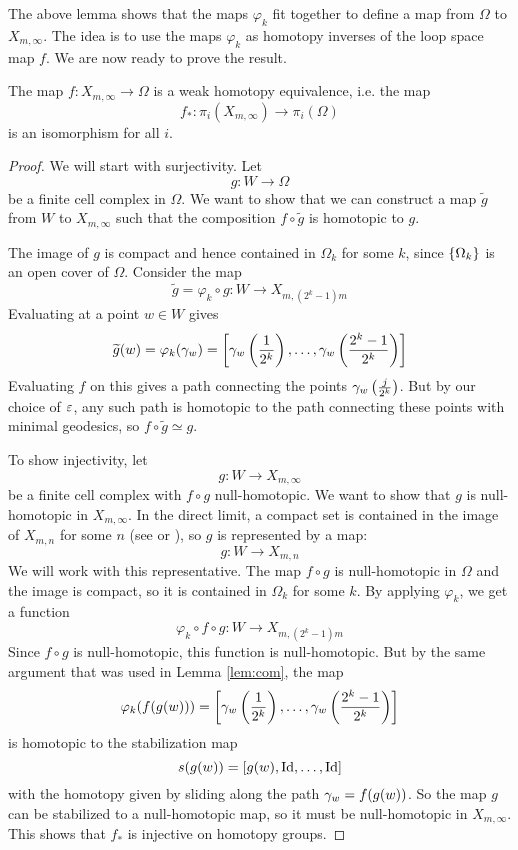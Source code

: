 The above lemma shows that the maps $\varphi_k$ fit together to define
a map from $\Omega$ to $X_{m,\infty}$.
The idea is to use the maps $\varphi_k$ as homotopy inverses of the
loop space map $f$. We are now ready to prove the result.

\begin{theorem}
  The map $f : X_{m,\infty} \to \Omega$ is a weak homotopy
  equivalence, i.e. the map
  \[f_* : \pi_i(X_{m,\infty}) \to \pi_i(\Omega)\]
  is an isomorphism for all $i$.
\end{theorem}

\begin{proof}
  We will start with surjectivity. Let
  \[ g : W \to \Omega \]
  be a finite cell complex in $\Omega$. We want to show that we can
  construct a map $\widetilde g$ from $W$ to $X_{m,\infty}$ such that
  the composition $f\circ \widetilde g$ is homotopic to $g$.
  
  The image of $g$ is compact and hence contained in $\Omega_k$ for
  some $k$, since $\left\{ \Omega_k \right\}$ is an open cover of
  $\Omega$. Consider the map 
  \[ \widetilde g = \varphi_k\circ g : W \to X_{m,(2^k-1)m} \]
  Evaluating at a point $w\in W$ gives
  \[ \widetilde g(w) = \varphi_k(\gamma_w) = \left[
    \gamma_w\left(\frac{1}{2^k}\right),\dots,
    \gamma_w\left(\frac{2^k-1}{2^k}\right) \right] \]
  Evaluating $f$ on this gives a path connecting the points
  $\gamma_w\left(\frac{j}{2^k}\right)$. But by our choice of $\varepsilon$, any
  such path is homotopic to the path connecting these points with
  minimal geodesics, so $f\circ\widetilde g \simeq g$.

  To show injectivity, let
  \[ g : W \to X_{m,\infty}\]
  be a finite cell complex with $f\circ g$ null-homotopic. We want to
  show that $g$ is null-homotopic in $X_{m,\infty}$. In the
  direct limit, a compact set is contained in the image of $X_{m,n}$
  for some $n$ (see \cite[Proposition~A.1]{hatcher} or
  \cite[Chapter~9.4]{may}), so $g$ is represented by a map:
  \[ g : W \to X_{m,n} \]
  We will work with this representative. The map $f\circ
  g$ is null-homotopic in $\Omega$ and the image is compact, so it is
  contained in $\Omega_k$ for some $k$. By applying $\varphi_k$, we
  get a function
  \[ \varphi_k\circ f\circ g : W \to X_{m,(2^k-1)m} \]
  Since $f\circ g$ is null-homotopic, this function is
  null-homotopic. But by the same argument that was used in
  Lemma \ref{lem:com}, the map
  \[ \varphi_k(f(g(w))) = \left[
    \gamma_w\left(\frac{1}{2^k}\right),\dots,\gamma_w\left(\frac{2^k-1}{2^k}
    \right)\right] \] 
  is homotopic to the stabilization map
  \[ s(g(w)) = \left[g(w),\operatorname{Id},\dots,\operatorname{Id}\right] \]
  with the homotopy given by sliding along the path $\gamma_w=f(g(w))$.
  So the map $g$ can be stabilized to a null-homotopic map, so it must
  be null-homotopic in $X_{m,\infty}$. This shows that $f_*$ is
  injective on homotopy groups.
\end{proof}

